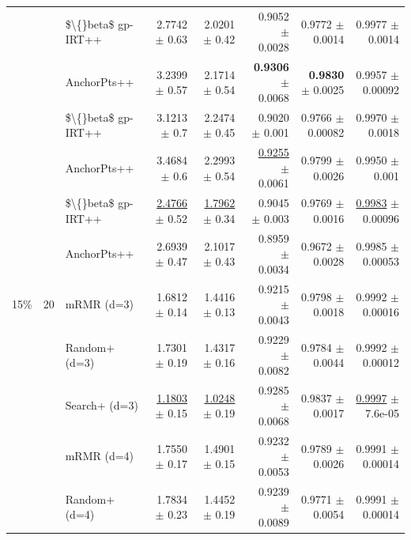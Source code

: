 \begin{longtable}{llp{}rrrrr}
 &  & \$\textbackslash\{\}beta\$ gp-IRT++ & 2.7742 {\scriptsize $\pm$ 0.63} & 2.0201 {\scriptsize $\pm$ 0.42} & 0.9052 {\scriptsize $\pm$ 0.0028} & 0.9772 {\scriptsize $\pm$ 0.0014} & 0.9977 {\scriptsize $\pm$ 0.0014} \\
 &  & AnchorPts++ & 3.2399 {\scriptsize $\pm$ 0.57} & 2.1714 {\scriptsize $\pm$ 0.54} & \textbf{0.9306} {\scriptsize $\pm$ 0.0068} & \textbf{0.9830} {\scriptsize $\pm$ 0.0025} & 0.9957 {\scriptsize $\pm$ 0.00092} \\
 &  & \$\textbackslash\{\}beta\$ gp-IRT++ & 3.1213 {\scriptsize $\pm$ 0.7} & 2.2474 {\scriptsize $\pm$ 0.45} & 0.9020 {\scriptsize $\pm$ 0.001} & 0.9766 {\scriptsize $\pm$ 0.00082} & 0.9970 {\scriptsize $\pm$ 0.0018} \\
 &  & AnchorPts++ & 3.4684 {\scriptsize $\pm$ 0.6} & 2.2993 {\scriptsize $\pm$ 0.54} & \underline{0.9255} {\scriptsize $\pm$ 0.0061} & 0.9799 {\scriptsize $\pm$ 0.0026} & 0.9950 {\scriptsize $\pm$ 0.001} \\
 &  & \$\textbackslash\{\}beta\$ gp-IRT++ & \underline{2.4766} {\scriptsize $\pm$ 0.52} & \underline{1.7962} {\scriptsize $\pm$ 0.34} & 0.9045 {\scriptsize $\pm$ 0.003} & 0.9769 {\scriptsize $\pm$ 0.0016} & \underline{0.9983} {\scriptsize $\pm$ 0.00096} \\
 &  & AnchorPts++ & 2.6939 {\scriptsize $\pm$ 0.47} & 2.1017 {\scriptsize $\pm$ 0.43} & 0.8959 {\scriptsize $\pm$ 0.0034} & 0.9672 {\scriptsize $\pm$ 0.0028} & 0.9985 {\scriptsize $\pm$ 0.00053} \\
\midrule
15\% & 20 & mRMR (d=3) & 1.6812 {\scriptsize $\pm$ 0.14} & 1.4416 {\scriptsize $\pm$ 0.13} & 0.9215 {\scriptsize $\pm$ 0.0043} & 0.9798 {\scriptsize $\pm$ 0.0018} & 0.9992 {\scriptsize $\pm$ 0.00016} \\
 &  & Random+ (d=3) & 1.7301 {\scriptsize $\pm$ 0.19} & 1.4317 {\scriptsize $\pm$ 0.16} & 0.9229 {\scriptsize $\pm$ 0.0082} & 0.9784 {\scriptsize $\pm$ 0.0044} & 0.9992 {\scriptsize $\pm$ 0.00012} \\
 &  & Search+ (d=3) & \underline{1.1803} {\scriptsize $\pm$ 0.15} & \underline{1.0248} {\scriptsize $\pm$ 0.19} & 0.9285 {\scriptsize $\pm$ 0.0068} & 0.9837 {\scriptsize $\pm$ 0.0017} & \underline{0.9997} {\scriptsize $\pm$ 7.6e-05} \\
 &  & mRMR (d=4) & 1.7550 {\scriptsize $\pm$ 0.17} & 1.4901 {\scriptsize $\pm$ 0.15} & 0.9232 {\scriptsize $\pm$ 0.0053} & 0.9789 {\scriptsize $\pm$ 0.0026} & 0.9991 {\scriptsize $\pm$ 0.00014} \\
 &  & Random+ (d=4) & 1.7834 {\scriptsize $\pm$ 0.23} & 1.4452 {\scriptsize $\pm$ 0.19} & 0.9239 {\scriptsize $\pm$ 0.0089} & 0.9771 {\scriptsize $\pm$ 0.0054} & 0.9991 {\scriptsize $\pm$ 0.00014} \\

\end{longtable}
